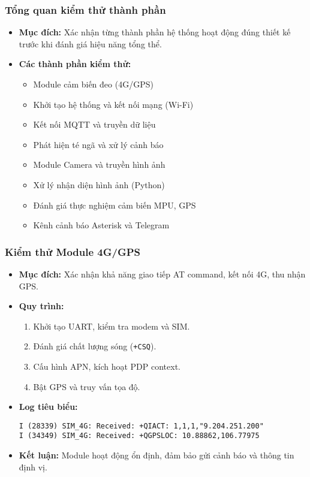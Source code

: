 
\begin{frame}[t,fragile]
\frametitle{Tổng quan kiểm thử thành phần}
\begin{itemize}
    \item \textbf{Mục đích:} Xác nhận từng thành phần hệ thống hoạt động đúng thiết kế trước khi đánh giá hiệu năng tổng thể.
    \item \textbf{Các thành phần kiểm thử:}
    \begin{itemize}
        \item Module cảm biến đeo (4G/GPS)
        \item Khởi tạo hệ thống và kết nối mạng (Wi-Fi)
        \item Kết nối MQTT và truyền dữ liệu
        \item Phát hiện té ngã và xử lý cảnh báo
        \item Module Camera và truyền hình ảnh
        \item Xử lý nhận diện hình ảnh (Python)
        \item Đánh giá thực nghiệm cảm biến MPU, GPS
        \item Kênh cảnh báo Asterisk và Telegram
    \end{itemize}
\end{itemize}
\end{frame}

\begin{frame}[t,fragile]
\frametitle{Kiểm thử Module 4G/GPS}
\begin{itemize}
    \item \textbf{Mục đích:} Xác nhận khả năng giao tiếp AT command, kết nối 4G, thu nhận GPS.
    \item \textbf{Quy trình:}
    \begin{enumerate}
        \item Khởi tạo UART, kiểm tra modem và SIM.
        \item Đánh giá chất lượng sóng (\texttt{+CSQ}).
        \item Cấu hình APN, kích hoạt PDP context.
        \item Bật GPS và truy vấn tọa độ.
    \end{enumerate}
    \item \textbf{Log tiêu biểu:}
    \begin{verbatim}
I (28339) SIM_4G: Received: +QIACT: 1,1,1,"9.204.251.200"
I (34349) SIM_4G: Received: +QGPSLOC: 10.88862,106.77975
    \end{verbatim}
    \item \textbf{Kết luận:} Module hoạt động ổn định, đảm bảo gửi cảnh báo và thông tin định vị.
\end{itemize}
\end{frame}

